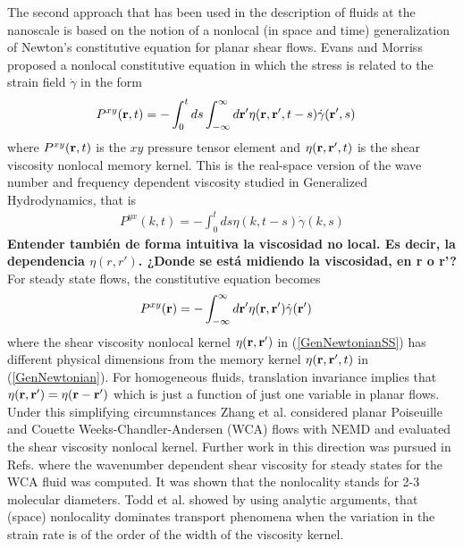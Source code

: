 \documentclass[b5paper,openright,11pt]{book}
\newcommand{\Note}[1]{{\bf \color{red}#1}}    %
\begin{document}
The second approach that has been used in the description of fluids at
the nanoscale  is based  on the  notion of a  nonlocal (in  space and
time)  generalization of  Newton's  constitutive  equation for  planar
shear  flows. Evans and Morriss \cite{EvansMorriss2008} proposed a nonlocal constitutive equation in  which  the  stress is  related  to  the strain  field $\dot{\gamma}$ in the form
\begin{align}
  P^{xy}({\bf r},t)&=-\int_0^t ds \int_{-\infty}^{\infty} d{\bf r}'
\eta({\bf r},{\bf r}',t-s)\dot{\gamma}({\bf r}',s)
\label{GenNewtonian}   %
\end{align}
where  $P^{xy}({\bf r}, t)$ is the $xy$ pressure tensor element and $\eta({\bf r},{\bf  r}',t)$  is the  shear viscosity  nonlocal
memory kernel.  This is the real-space  version of the wave number and
frequency     dependent    viscosity \cite{EvansMorriss2008}     studied    in     Generalized
Hydrodynamics, that is 
\begin{align}
  P^{yx}(k,t) = -\int_0^t ds\eta(k,t-s)\dot{\gamma}(k,s)
\end{align}
\Note{Entender también de forma intuitiva la viscosidad no local. Es decir, la dependencia $\eta(r,r')$. ¿Donde se está midiendo la viscosidad, en r o r'?}
For  steady  state flows,  the  constitutive  equation
becomes
\begin{align}
  P^{xy}({\bf r})&=-\int_{-\infty}^{\infty} d{\bf r}'
\eta({\bf r},{\bf r}')\dot{\gamma}({\bf r}')
\label{GenNewtonianSS}
\end{align}
where the shear viscosity nonlocal kernel $\eta({\bf r},{\bf r}')$ in
(\ref{GenNewtonianSS})  has  different  physical dimensions  from  the
memory kernel $\eta({\bf r},{\bf r}',t)$ in (\ref{GenNewtonian}).  For
homogeneous  fluids, translation  invariance  implies that  $\eta({\bf
  r},{\bf r}')=\eta({\bf  r}-{\bf r}')$  which is  just a  function of
just   one  variable   in  planar   flows.   Under   this  simplifying
circumnstances  Zhang  et   al.   \cite{Zhang2004}  considered  planar
Poiseuille  and  Couette  Weeks-Chandler-Andersen (WCA) flows  with NEMD  and  evaluated  the  shear
viscosity  nonlocal kernel.  Further  work in
this        direction        was        pursued        in        Refs.
\cite{Hansen2007,Todd2008a,Cadusch2008}    where    the    wavenumber
dependent  shear viscosity  for steady  states for  the WCA fluid was
computed. It was shown that  the nonlocality stands for 2-3 molecular
diameters.   Todd et  al.   \cite{Todd2008} showed  by using  analytic
arguments, that (space) nonlocality dominates transport phenomena when
the variation in the  strain rate is of the order of  the width of the
viscosity kernel.
\end{document}
